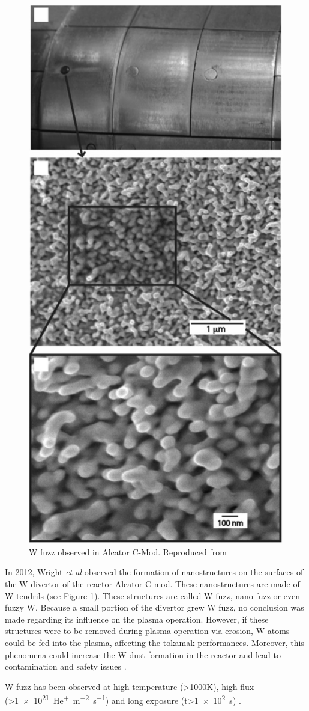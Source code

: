 \begin{figure} [h!]
    \centering
    \includegraphics[width=0.5\linewidth]{Figures/Chapter1/fuzz_alcator_wright.jpg}
    \caption{W fuzz observed in Alcator C-Mod. Reproduced from \cite{wright_tungsten_2012}}
    \label{fig: w fuzz wright}
\end{figure}

In 2012, Wright \textit{et al}  observed the formation of nanostructures on the surfaces of the W divertor of the reactor Alcator C-mod.
These nanostructures are made of W tendrils (see Figure \ref{fig: w fuzz wright}).
These structures are called W fuzz, nano-fuzz or even fuzzy W.
Because a small portion of the divertor grew W fuzz, no conclusion was made regarding its influence on the plasma operation.
However, if these structures were to be removed during plasma operation via erosion, W atoms could be fed into the plasma, affecting the tokamak performances.
Moreover, this phenomena could increase the W dust formation in the reactor and lead to contamination and safety issues .

W fuzz has been observed at high temperature (>1000K), high flux (>\SI{1e21}{He^+.m^{-2}.s^{-1}}) and long exposure (t>\SI{1e2}{s}) .


